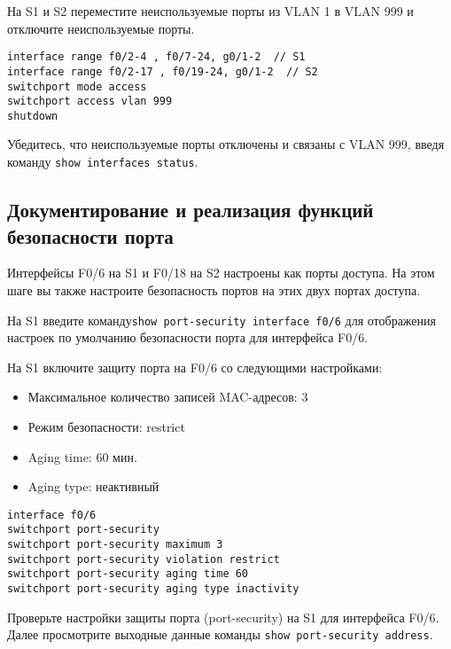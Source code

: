 На S1 и S2 переместите неиспользуемые порты из VLAN 1 в VLAN 999
и отключите неиспользуемые порты.

\begin{verbatim}
interface range f0/2-4 , f0/7-24, g0/1-2  // S1
interface range f0/2-17 , f0/19-24, g0/1-2  // S2
switchport mode access
switchport access vlan 999
shutdown
\end{verbatim}

Убедитесь, что неиспользуемые порты отключены и связаны с VLAN 999,
введя команду \texttt{show interfaces status}.


\subsection{Документирование и реализация функций безопасности порта}

Интерфейсы F0/6 на S1 и F0/18 на S2 настроены как порты доступа.
На этом шаге вы также настроите безопасность портов
на этих двух портах доступа.

На S1 введите команду\texttt{show port-security interface f0/6}
для отображения настроек по умолчанию безопасности порта для интерфейса F0/6.


На S1 включите защиту порта на F0/6 со следующими настройками:

\begin{itemize}
    \item Максимальное количество записей MAC-адресов: 3
    \item Режим безопасности: restrict
    \item Aging time: 60 мин.
    \item Aging type: неактивный
\end{itemize}

\begin{verbatim}
interface f0/6
switchport port-security
switchport port-security maximum 3
switchport port-security violation restrict
switchport port-security aging time 60
switchport port-security aging type inactivity
\end{verbatim}

Проверьте настройки защиты порта (port-security) на S1 для интерфейса F0/6.
Далее просмотрите выходные данные команды \texttt{show port-security address}.


